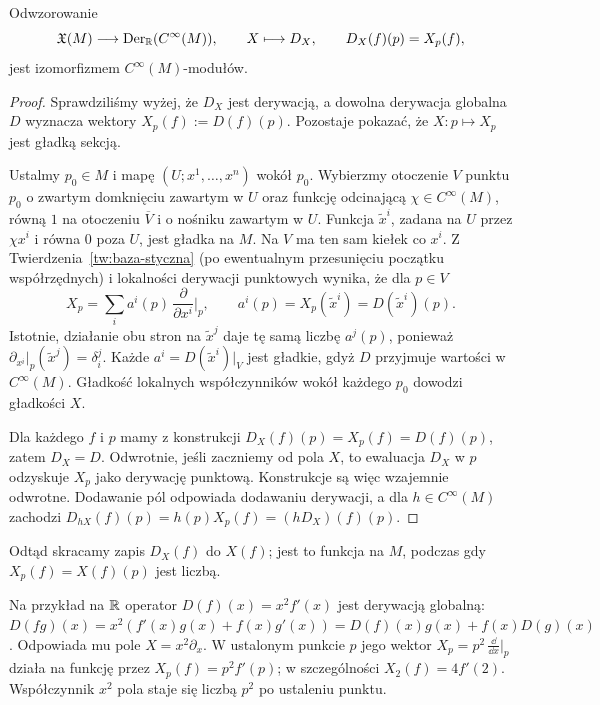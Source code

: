 \begin{twierdzenie}\label{thm:derywacje-pola}
Odwzorowanie
\[
 \mathfrak X(M)\longrightarrow\operatorname{Der}_{\mathbb{R}}(C^\infty(M)),
 \qquad X\longmapsto D_X,\qquad D_X(f)(p)=X_p(f),
\]
jest izomorfizmem $C^\infty(M)$-modułów.
\end{twierdzenie}
\begin{proof}
Sprawdziliśmy wyżej, że $D_X$ jest derywacją, a dowolna
derywacja globalna $D$ wyznacza wektory $X_p(f):=D(f)(p)$.
Pozostaje pokazać, że $X\colon p\mapsto X_p$ jest gładką sekcją.

Ustalmy $p_0\in M$ i mapę $(U;x^1,\ldots,x^n)$ wokół $p_0$.
Wybierzmy otoczenie $V$ punktu $p_0$ o zwartym domknięciu zawartym w $U$
oraz funkcję odcinającą $\chi\in C^\infty(M)$, równą $1$ na
otoczeniu $\overline V$ i o nośniku zawartym w $U$.
Funkcja $\widetilde x^i$, zadana na $U$ przez $\chi x^i$ i równa
$0$ poza $U$, jest gładka na $M$. Na $V$ ma ten sam kiełek co $x^i$.
Z Twierdzenia~\ref{tw:baza-styczna} (po ewentualnym przesunięciu
początku współrzędnych) i lokalności derywacji punktowych
wynika, że dla $p\in V$
\[
 X_p=\sum_i a^i(p)\,\frac{\partial}{\partial x^i}\Big|_p,
 \qquad a^i(p)=X_p(\widetilde x^i)=D(\widetilde x^i)(p).
\]
Istotnie, działanie obu stron na $\widetilde x^j$ daje tę samą
liczbę $a^j(p)$, ponieważ
$\partial_{x^i}|_p(\widetilde x^j)=\delta_i^j$.
Każde $a^i=D(\widetilde x^i)|_V$ jest gładkie, gdyż $D$ przyjmuje
wartości w $C^\infty(M)$. Gładkość lokalnych współczynników
wokół każdego $p_0$ dowodzi gładkości $X$.

Dla każdego $f$ i $p$ mamy z konstrukcji
$D_X(f)(p)=X_p(f)=D(f)(p)$, zatem $D_X=D$.
Odwrotnie, jeśli zaczniemy od pola $X$, to ewaluacja $D_X$
w $p$ odzyskuje $X_p$ jako derywację punktową. Konstrukcje są więc
wzajemnie odwrotne. Dodawanie pól odpowiada dodawaniu derywacji,
a dla $h\in C^\infty(M)$ zachodzi
$D_{hX}(f)(p)=h(p)X_p(f)=(hD_X)(f)(p)$.
\end{proof}

Odtąd skracamy zapis $D_X(f)$ do $X(f)$; jest to funkcja na $M$,
podczas gdy $X_p(f)=X(f)(p)$ jest liczbą.

Na przykład na $\mathbb{R}$ operator $D(f)(x)=x^2f'(x)$ jest derywacją
globalną: $D(fg)(x)=x^2(f'(x)g(x)+f(x)g'(x))
=D(f)(x)g(x)+f(x)D(g)(x)$. Odpowiada mu pole
$X=x^2\partial_x$. W ustalonym punkcie $p$ jego wektor
$X_p=p^2\,\frac{\dd}{\dd x}\big|_p$ działa na funkcję przez
$X_p(f)=p^2f'(p)$; w szczególności $X_2(f)=4f'(2)$.
Współczynnik $x^2$ pola staje się liczbą $p^2$ po ustaleniu punktu.

